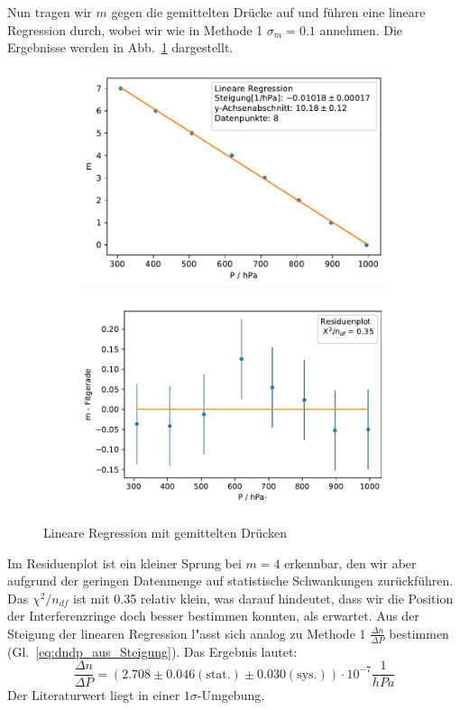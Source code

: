 \documentclass[12pt,a4paper]{article}
\begin{document}
Nun tragen wir $m$ gegen die gemittelten Drücke auf und führen eine lineare Regression durch, wobei wir wie in Methode 1 $\sigma_m=0.1$ annehmen. Die Ergebnisse werden in Abb.~\ref{gemittelterDruck_LinReg} dargestellt.
\begin{figure}[H]
	\centering	
	\begin{subfigure}{0.49\textwidth}
		\centering
		\includegraphics[width=\textwidth]{Python/gemittelterDruck_LinReg.pdf}
	\end{subfigure}
	\begin{subfigure}{0.49\textwidth}
		\centering
		\includegraphics[width=\textwidth]{Python/gemittelterDruck_Residuen.pdf}
	\end{subfigure}
	\caption{Lineare Regression mit gemittelten Drücken}
	\label{gemittelterDruck_LinReg}
\end{figure}
Im Residuenplot ist ein kleiner Sprung bei $m=4$ erkennbar, den wir aber aufgrund der geringen Datenmenge auf statistische Schwankungen zurückführen. Das $\chi^2/n_{df}$ ist mit 0.35 relativ klein, was darauf hindeutet, dass wir die Position der Interferenzringe doch besser bestimmen konnten, als erwartet. Aus der Steigung der linearen Regression l"asst sich analog zu Methode 1 $\frac{\Delta n}{\Delta P}$ bestimmen (Gl.~\eqref{eq:dndp_aus_Steigung}). Das Ergebnis lautet:
\begin{equation}
\frac{\Delta n}{\Delta P}=(2.708\pm 0.046(\text{stat.})\pm 0.030(\text{sys.}))\cdot10^{-7}\frac{1}{hPa}
\end{equation}
Der Literaturwert liegt in einer $1\sigma$-Umgebung. 
\end{document}
